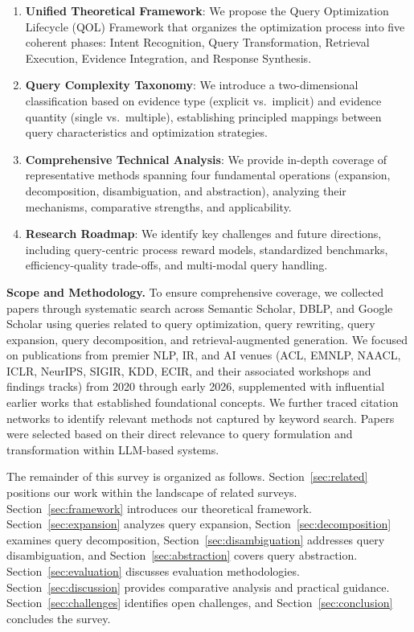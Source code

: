 \documentclass{article}
\begin{document}
\begin{enumerate}[leftmargin=*]
    \item \textbf{Unified Theoretical Framework}: We propose the Query Optimization Lifecycle (QOL) Framework that organizes the optimization process into five coherent phases: Intent Recognition, Query Transformation, Retrieval Execution, Evidence Integration, and Response Synthesis.
    
    \item \textbf{Query Complexity Taxonomy}: We introduce a two-dimensional classification based on evidence type (explicit vs.\ implicit) and evidence quantity (single vs.\ multiple), establishing principled mappings between query characteristics and optimization strategies.
    
    \item \textbf{Comprehensive Technical Analysis}: We provide in-depth coverage of representative methods spanning four fundamental operations (expansion, decomposition, disambiguation, and abstraction), analyzing their mechanisms, comparative strengths, and applicability.
    
    \item \textbf{Research Roadmap}: We identify key challenges and future directions, including query-centric process reward models, standardized benchmarks, efficiency-quality trade-offs, and multi-modal query handling.
\end{enumerate}

\textbf{Scope and Methodology.} To ensure comprehensive coverage, we collected papers through systematic search across Semantic Scholar, DBLP, and Google Scholar using queries related to query optimization, query rewriting, query expansion, query decomposition, and retrieval-augmented generation. We focused on publications from premier NLP, IR, and AI venues (ACL, EMNLP, NAACL, ICLR, NeurIPS, SIGIR, KDD, ECIR, and their associated workshops and findings tracks) from 2020 through early 2026, supplemented with influential earlier works that established foundational concepts. We further traced citation networks to identify relevant methods not captured by keyword search. Papers were selected based on their direct relevance to query formulation and transformation within LLM-based systems.

The remainder of this survey is organized as follows. Section~\ref{sec:related} positions our work within the landscape of related surveys. Section~\ref{sec:framework} introduces our theoretical framework. Section~\ref{sec:expansion} analyzes query expansion, Section~\ref{sec:decomposition} examines query decomposition, Section~\ref{sec:disambiguation} addresses query disambiguation, and Section~\ref{sec:abstraction} covers query abstraction. Section~\ref{sec:evaluation} discusses evaluation methodologies. Section~\ref{sec:discussion} provides comparative analysis and practical guidance. Section~\ref{sec:challenges} identifies open challenges, and Section~\ref{sec:conclusion} concludes the survey.
\end{document}
